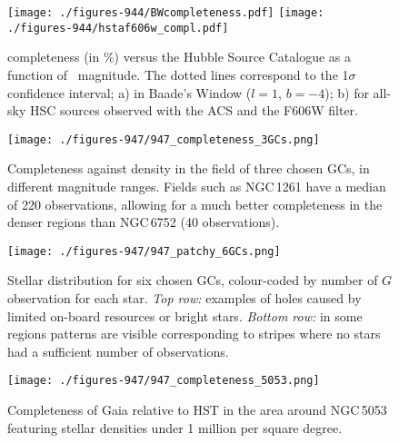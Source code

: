 \begin{figure}
    \begin{center}
        \texttt{[image: ./figures-944/BWcompleteness.pdf]}
        \texttt{[image: ./figures-944/hstaf606w\_compl.pdf]}
        \caption[{} completeness versus HST]{{} completeness (in \%) versus the Hubble Source Catalogue as a function of \ghst\ magnitude. The dotted lines correspond to the 1$\sigma$ confidence interval; a) in Baade's Window ($l=1${\deg}, $b=-4${\deg}); b) for all-sky HSC sources observed with the ACS and the F606W filter. }
        \label{fig:cu9val_wp944_HSTcompl} 
    \end{center}
\end{figure}



\begin{figure*}
\centering
\texttt{[image: ./figures-947/947\_completeness\_3GCs.png]}
\caption{Completeness against density in the field of three chosen GCs, in different magnitude ranges. Fields such as NGC\,1261 have a median of 220 observations, allowing for a much better completeness in the denser regions than NGC\,6752 (40 observations). } \label{fig:947_completeness_3GCs}
\end{figure*}

\begin{figure*}
\centering
\texttt{[image: ./figures-947/947\_patchy\_6GCs.png]}
\caption{Stellar distribution for six chosen GCs, colour-coded by number of $G$ observation for each star. \textit{Top row:} examples of holes caused by limited on-board resources or bright stars. \textit{Bottom row:} in some regions patterns are visible corresponding to stripes where no stars had a sufficient number of observations. } \label{fig:947_patchy_6GCs}
\end{figure*}

\begin{figure}
\centering
\texttt{[image: ./figures-947/947\_completeness\_5053.png]}
\caption{Completeness of Gaia relative to HST in the area around NGC\,5053 featuring stellar densities under 1 million per square degree.} \label{fig:947_completeness_5053}
\end{figure}

